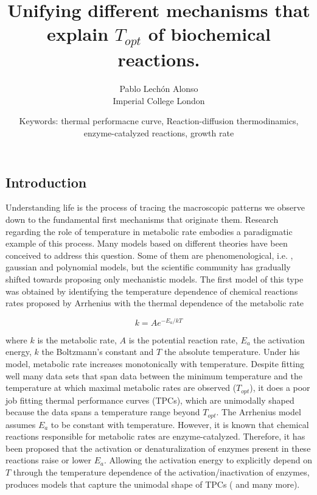 \documentclass[titlepage,11pt]{article}
\begin{document}
	
	\title{\textbf{Unifying different mechanisms that explain $ T_{opt} $ of biochemical reactions. }}
	\author{Pablo Lechón Alonso \\ [30pt]
		Imperial College London}
	\date{Keywords: thermal performacne curve, Reaction-diffusion thermodinamics, enzyme-catalyzed reactions, growth rate}
	\maketitle
	\begin{linenumbers}
		\section{Introduction}
		Understanding life is the process of tracing the macroscopic patterns we observe down to the fundamental first mechanisms that originate them. Research regarding the role of temperature in metabolic rate embodies a paradigmatic example of this process. Many models based on different theories have been conceived to address this question. Some of them are phenomenological, i.e. \cite{Ratkowsky1982, Lactin1995}, gaussian and polynomial models, but the scientific community has gradually shifted towards proposing only mechanistic models. The first model of this type was obtained by identifying the temperature dependence of chemical reactions rates proposed by Arrhenius \cite{Arrhenius1889} with the thermal dependence of the metabolic rate
		\begin{linenomath}
			\begin{equation}
			k = A e^{-E_a/kT}
			\end{equation}
		\end{linenomath}
		where $ k $ is the metabolic rate, $ A $ is the potential reaction rate, $ E_a $ the activation energy, $ k $ the Boltzmann's constant and $ T $ the absolute temperature. Under his model, metabolic rate increases monotonically with temperature. Despite fitting well many data sets that span data between the minimum temperature and the temperature at which maximal metabolic rates are observed ($ T_{opt} $), it does a poor job fitting thermal performance curves (TPCs), which are unimodally shaped because the data spans a temperature range beyond $ T_{opt} $. The Arrhenius model assumes $ E_a $ to be constant with temperature. However, it is known that chemical reactions responsible for metabolic rates are enzyme-catalyzed. Therefore, it has been proposed that the activation or denaturalization of enzymes present in these reactions raise or lower $ E_a $. Allowing the activation energy to explicitly depend on $ T $ through the temperature dependence of the activation/inactivation of enzymes, produces models that capture the unimodal shape of TPCs (\cite{Johnson1946, Schoolfield1981, Ratkowsky2005, DeLong2017} and many more). \\

\end{linenumbers}
\end{document}
